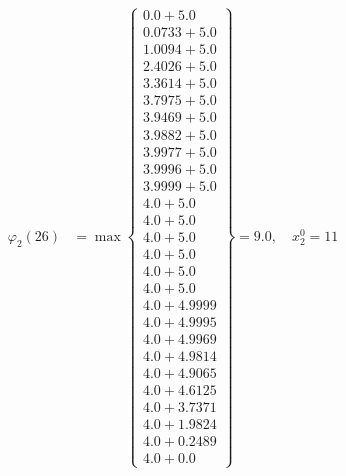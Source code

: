 \documentclass{article}
\begin{document}
\begin{align*}
  
\varphi_{2}(26) &= \max \left\{ \begin{array}{c}
0.0 + 5.0 \\
 0.0733 + 5.0 \\
 1.0094 + 5.0 \\
 2.4026 + 5.0 \\
 3.3614 + 5.0 \\
 3.7975 + 5.0 \\
 3.9469 + 5.0 \\
 3.9882 + 5.0 \\
 3.9977 + 5.0 \\
 3.9996 + 5.0 \\
 3.9999 + 5.0 \\
 4.0 + 5.0 \\
 4.0 + 5.0 \\
 4.0 + 5.0 \\
 4.0 + 5.0 \\
 4.0 + 5.0 \\
 4.0 + 5.0 \\
 4.0 + 4.9999 \\
 4.0 + 4.9995 \\
 4.0 + 4.9969 \\
 4.0 + 4.9814 \\
 4.0 + 4.9065 \\
 4.0 + 4.6125 \\
 4.0 + 3.7371 \\
 4.0 + 1.9824 \\
 4.0 + 0.2489 \\
 4.0 + 0.0
\end{array} \right\}=9.0,\quad x_{2}^0=11\\
  
  
  

\end{align*}
\end{document}
